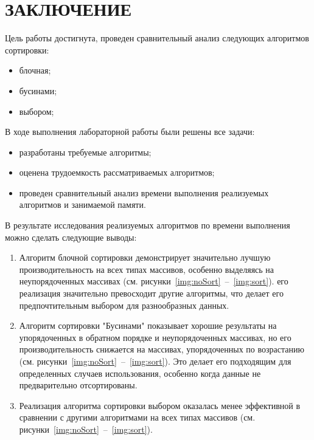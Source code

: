 \chapter*{ЗАКЛЮЧЕНИЕ}


Цель работы достигнута, проведен сравнительный анализ следующих алгоритмов сортировки:
\begin{itemize}
	\item блочная;
	\item бусинами;
	\item выбором;
\end{itemize}

В ходе выполнения лабораторной работы были решены все задачи:
\begin{itemize}
	\item разработаны требуемые алгоритмы;
	\item оценена трудоемкость рассматриваемых алгоритмов;
	\item проведен сравнительный анализ времени выполнения реализуемых алгоритмов и занимаемой памяти.
\end{itemize}

В результате исследования реализуемых алгоритмов по времени выполнения можно сделать следующие выводы:
\begin{enumerate}
	\item Алгоритм блочной сортировки демонстрирует значительно лучшую производительность на всех типах массивов, особенно выделяясь на неупорядоченных массивах (см. рисунки~\ref{img:noSort}~--~\ref{img:sort}). его реализация значительно превосходит другие алгоритмы, что делает его предпочтительным выбором для разнообразных данных.
	\item Алгоритм сортировки "Бусинами" показывает хорошие результаты на упорядоченных в обратном порядке и неупорядоченных массивах, но его  производительность снижается на массивах, упорядоченных по возрастанию (см. рисунки~\ref{img:noSort}~--~\ref{img:sort}). Это делает его подходящим для определенных случаев использования, особенно когда данные не предварительно отсортированы.
	\item Реализация алгоритма сортировки выбором  оказалась менее эффективной в сравнении с другими алгоритмами на всех типах массивов (см. рисунки~\ref{img:noSort}~--~\ref{img:sort}).
\end{enumerate}
